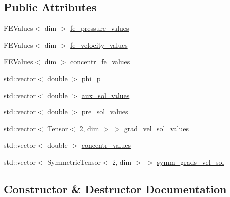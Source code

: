 \subsection*{Public Attributes}
\begin{DoxyCompactItemize}
\item 
F\+E\+Values$<$ dim $>$ \hyperlink{struct_assembly_1_1_scratch_1_1pressure__rot__step_ac41f7bf5aa82b80e01ba8453c31e5fdd}{fe\+\_\+pressure\+\_\+values}
\item 
F\+E\+Values$<$ dim $>$ \hyperlink{struct_assembly_1_1_scratch_1_1pressure__rot__step_af0e05e66de3967bf2736defbcee157d5}{fe\+\_\+velocity\+\_\+values}
\item 
F\+E\+Values$<$ dim $>$ \hyperlink{struct_assembly_1_1_scratch_1_1pressure__rot__step_a897061bf69830b1212f797ff3af9d250}{concentr\+\_\+fe\+\_\+values}
\item 
std\+::vector$<$ double $>$ \hyperlink{struct_assembly_1_1_scratch_1_1pressure__rot__step_aeaca955234a85e889b5c71e912240025}{phi\+\_\+p}
\item 
std\+::vector$<$ double $>$ \hyperlink{struct_assembly_1_1_scratch_1_1pressure__rot__step_abd85718af16840d6abc3a01abe1fb6e3}{aux\+\_\+sol\+\_\+values}
\item 
std\+::vector$<$ double $>$ \hyperlink{struct_assembly_1_1_scratch_1_1pressure__rot__step_a9de7969f5b98cb8dfc629301647b5c3e}{pre\+\_\+sol\+\_\+values}
\item 
std\+::vector$<$ Tensor$<$ 2, dim $>$ $>$ \hyperlink{struct_assembly_1_1_scratch_1_1pressure__rot__step_a8530984bbf6ea328b90cf347b748bdc6}{grad\+\_\+vel\+\_\+sol\+\_\+values}
\item 
std\+::vector$<$ double $>$ \hyperlink{struct_assembly_1_1_scratch_1_1pressure__rot__step_a80d0030ad6c786b9d1e7e5365497ac41}{concentr\+\_\+values}
\item 
std\+::vector$<$ Symmetric\+Tensor$<$ 2, dim $>$ $>$ \hyperlink{struct_assembly_1_1_scratch_1_1pressure__rot__step_a1bfe900ee774329a556f620ae765573b}{symm\+\_\+grads\+\_\+vel\+\_\+sol}
\end{DoxyCompactItemize}


\subsection{Constructor \& Destructor Documentation}
\hypertarget{struct_assembly_1_1_scratch_1_1pressure__rot__step_a9a782a85d4cfb0b5f50a0fcd76924d23}{}
